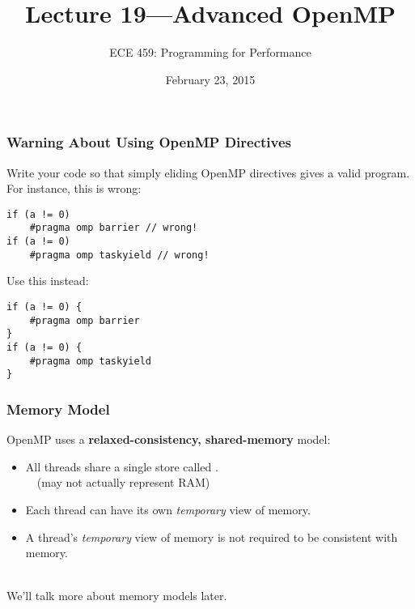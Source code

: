 \documentclass[aspectratio=43]{beamer}
\title{Lecture 19---Advanced OpenMP}
\subtitle{ECE 459: Programming for Performance}
\date{February 23, 2015}
\newenvironment{changemargin}[1]{%
  \begin{list}{}{%
    \setlength{\topsep}{0pt}%
    \setlength{\leftmargin}{#1}%
    \setlength{\rightmargin}{1em}
    \setlength{\listparindent}{\parindent}%
    \setlength{\itemindent}{\parindent}%
    \setlength{\parsep}{\parskip}%
  }%
  \item[]}{\end{list}}
\begin{document}
\begin{frame}[plain]
  \titlepage
\end{frame}

\begin{frame}[fragile]
  \frametitle{Warning About Using OpenMP Directives}

  \begin{changemargin}{1.5cm}

  Write your code so that simply eliding OpenMP directives gives a valid program.\\[1em]

  For instance, this is wrong:
  \begin{lstlisting}
if (a != 0)
    #pragma omp barrier // wrong!
if (a != 0)
    #pragma omp taskyield // wrong!
  \end{lstlisting}

  Use this instead:
  \begin{lstlisting}
if (a != 0) {
    #pragma omp barrier
}
if (a != 0) {
    #pragma omp taskyield
}
  \end{lstlisting}
  \end{changemargin}

\end{frame}

\begin{frame}
  \frametitle{Memory Model}

  \begin{changemargin}{1.5cm}

  OpenMP uses a {\bf relaxed-consistency, shared-memory} model:

  \begin{itemize}
    \item All threads share a single store called
      .\\ ~~(may not actually represent RAM)\\[1em]
    \item Each thread can have its own {\it temporary} view of memory.\\[1em]
    \item A thread's {\it temporary} view of memory is not required to be
      consistent with memory.
  \end{itemize}~\\

  We'll talk more about memory models later.
  \end{changemargin}
\end{frame}
\end{document}
